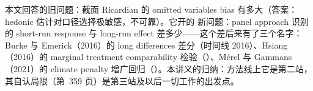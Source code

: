 本文回答的旧问题：截面 Ricardian 的 omitted variables bias 有多大（答案：hedonic 估计对口径选择极敏感，不可靠）。它开的 新问题：panel approach 识别的 short-run response 与 long-run effect 差多少——这个差后来有了三个名字：Burke 与 Emerick（2016）的 long differences 差分（时间线 2016）、Hsiang（2016）的 marginal treatment comparability 检验（）、Mérel 与 Gammans（2021）的 climate penalty 增广回归（）。本讲义的归纳：方法线上它是第二站，其自认局限（第~359 页）是第三站及以后一切工作的出发点。

\chapterrefs
